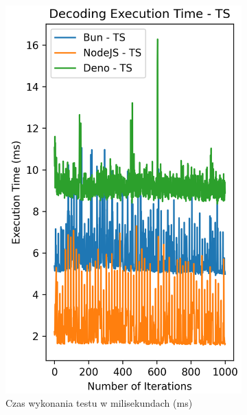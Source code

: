 \begin{figure}[H]
  \centering
  \begin{subfigure}[b]{0.4\textwidth}
    \centering
    \includegraphics[width=\textwidth]{Figures/coding/base64_1000_decoding_ts_time.png}
    \caption{Czas wykonania testu w milisekundach (ms)}
    \label{fig:decoding_e2_ts_time}
  \end{subfigure}
  \begin{subfigure}[b]{0.4\textwidth}
    \centering

\end{subfigure}
\end{figure}
